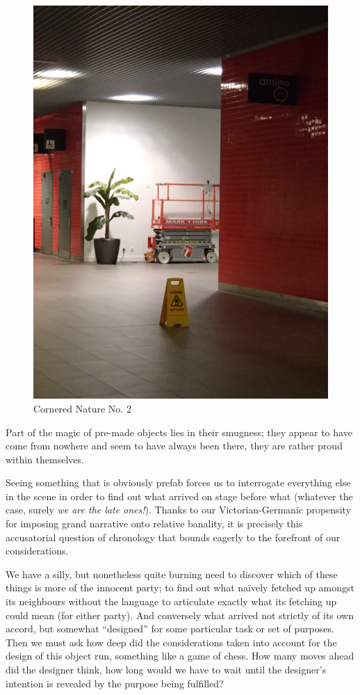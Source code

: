 \documentclass{book}
\begin{document}
\begin{figure}
\centering
\includegraphics[width=\textwidth,angle=-90]{figures/P1050158.JPG}
\caption{Cornered Nature No. 2}
\end{figure}

Part of the magic of pre-made objects lies in their smugness; they appear to
have come from nowhere and seem to have always been there, they are rather
proud within themselves.

Seeing something that is obviously prefab forces us to interrogate everything
else in the scene in order to find out what arrived on stage before what
(whatever the case, surely \emph{we are the late ones!}). Thanks to our
Victorian-Germanic propensity for imposing grand narrative onto relative
banality, it is precisely this accusatorial question of chronology
that bounds eagerly to the forefront of our considerations.

We have a silly, but nonetheless quite burning need to discover which of these
things is more of the innocent party; to find out what naïvely fetched up
amongst its neighbours without the language to articulate exactly what its
fetching up could mean (for either party). And conversely what arrived not
strictly of its own accord, but somewhat ``designed'' for some particular task
or set of purposes. Then we must ask how deep did the considerations taken into
account for the design of this object run, something like a game of chess. How
many moves ahead did the designer think, how long would we have to wait until
the designer's intention is revealed by the purpose being fulfilled?
\end{document}
